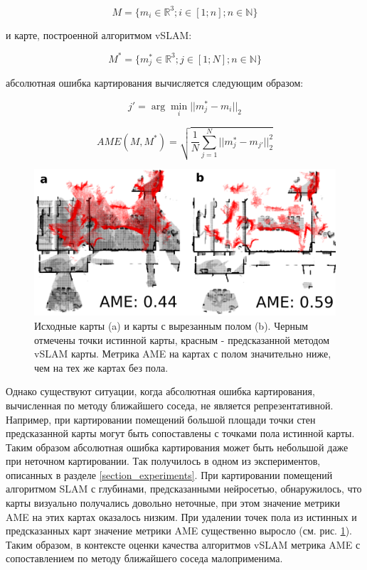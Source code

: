 \documentclass{mipt-thesis-ms}
\begin{document}
	\begin{equation}
	M=\{m_i \in \mathbb{R}^3; i \in [1;n]; n \in \mathbb{N}\}
	\label{eq_gt_map}
	\end{equation}
	
	и карте, построенной алгоритмом vSLAM:
	
	\begin{equation}
	M^*=\{m^*_j \in \mathbb{R}^3; j \in [1;N]; n \in \mathbb{N}\}
	\label{eq_vslam_map}
	\end{equation}
	
	абсолютная ошибка картирования вычисляется следующим образом:
	
	$$j' = \arg\min\limits_{i} ||m^*_j - m_{i}||_2$$
	
	\begin{equation}
		\label{eq_ame}		
		AME(M, M^*) = \sqrt{\frac{1}{N} \sum\limits_{j=1}^N ||m^*_j  - m_{j'}||_2^2}
	\end{equation}
	
	\begin{figure}
		\includegraphics[width=1.0\textwidth]{img/1_first_paired.png}
		\caption{Исходные карты (a) и карты с вырезанным полом (b). Черным отмечены точки истинной карты, красным - предсказанной методом vSLAM карты. Метрика AME на картах с полом значительно ниже, чем на тех же картах без пола.}
		\label{figure_floor}
	\end{figure}
	
	Однако существуют ситуации, когда абсолютная ошибка картирования, вычисленная по методу ближайшего соседа, не является репрезентативной. Например, при картировании помещений большой площади точки стен предсказанной карты могут быть сопоставлены с точками пола истинной карты. Таким образом абсолютная ошибка картирования может быть небольшой даже при неточном картировании. Так получилось в одном из экспериментов, описанных в разделе \ref{section_experiments}. При картировании помещений алгоритмом SLAM с глубинами, предсказанными нейросетью, обнаружилось, что карты визуально получались довольно неточные, при этом значение метрики AME на этих картах оказалось низким. При удалении точек пола из истинных и предсказанных карт значение метрики AME существенно выросло (см. рис. \ref{figure_floor}). Таким образом, в контексте оценки качества алгоритмов vSLAM метрика AME с сопоставлением по методу ближайшего соседа малоприменима.
	
\end{document}
